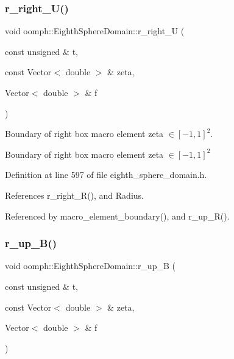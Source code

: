 \subsubsection{\texorpdfstring{r\+\_\+right\+\_\+\+U()}{r\_right\_U()}}
{\footnotesize\ttfamily void oomph\+::\+Eighth\+Sphere\+Domain\+::r\+\_\+right\+\_\+U (\begin{DoxyParamCaption}\item[{const unsigned \&}]{t,  }\item[{const Vector$<$ double $>$ \&}]{zeta,  }\item[{Vector$<$ double $>$ \&}]{f }\end{DoxyParamCaption})\hspace{0.3cm}{\ttfamily [private]}}



Boundary of right box macro element zeta $ \in [-1,1]^2 $. 

Boundary of right box macro element zeta $ \in [-1,1]^2 $ 

Definition at line 597 of file eighth\+\_\+sphere\+\_\+domain.\+h.



References r\+\_\+right\+\_\+\+R(), and Radius.



Referenced by macro\+\_\+element\+\_\+boundary(), and r\+\_\+up\+\_\+\+R().

\mbox{\label{classoomph_1_1EighthSphereDomain_aaac560ab6bbe35010c1ff61a466d1252}} 
\subsubsection{\texorpdfstring{r\+\_\+up\+\_\+\+B()}{r\_up\_B()}}
{\footnotesize\ttfamily void oomph\+::\+Eighth\+Sphere\+Domain\+::r\+\_\+up\+\_\+B (\begin{DoxyParamCaption}\item[{const unsigned \&}]{t,  }\item[{const Vector$<$ double $>$ \&}]{zeta,  }\item[{Vector$<$ double $>$ \&}]{f }\end{DoxyParamCaption})\hspace{0.3cm}{\ttfamily [private]}}



